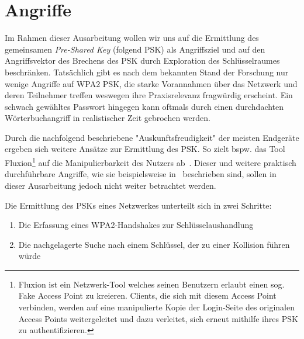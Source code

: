 \section{Angriffe}
Im Rahmen dieser Ausarbeitung wollen wir uns auf die Ermittlung des gemeinsamen \textit{Pre-Shared Key} (folgend PSK) als Angriffsziel und auf den Angriffsvektor des Brechens des PSK durch Exploration des Schlüsselraumes beschränken. 
Tatsächlich gibt es nach dem bekannten Stand der Forschung nur wenige Angriffe auf WPA2 PSK, die starke Vorannahmen über das Netzwerk und deren Teilnehmer treffen weswegen ihre Praxisrelevanz fragwürdig erscheint.
Ein schwach gewähltes Passwort hingegen kann oftmals durch einen durchdachten Wörterbuchangriff in realistischer Zeit gebrochen werden.

Durch die nachfolgend beschriebene "Auskunftsfreudigkeit" der meisten Endgeräte ergeben sich weitere Ansätze zur Ermittlung des PSK. 
So zielt bspw. das Tool Fluxion\footnote{Fluxion ist ein Netzwerk-Tool welches seinen Benutzern erlaubt einen sog. Fake Access Point zu kreieren. Clients, die sich mit diesem Access Point verbinden, werden auf eine manipulierte Kopie der Login-Seite des originalen Access Points weitergeleitet und dazu verleitet, sich erneut mithilfe ihres PSK zu authentifizieren.} auf die Manipulierbarkeit des Nutzers ab~\cite{fluxion}. 
Dieser und weitere praktisch durchführbare Angriffe, wie sie beispielsweise in~\cite{caneill2010attacks} beschrieben sind, sollen in dieser Ausarbeitung jedoch nicht weiter betrachtet werden.

Die Ermittlung des PSKs eines Netzwerkes unterteilt sich in zwei Schritte: 
\begin{enumerate}
	\item Die Erfassung eines WPA2-Handshakes zur Schlüsselaushandlung
	\item Die nachgelagerte Suche nach einem Schlüssel, der zu einer Kollision führen würde
\end{enumerate}

